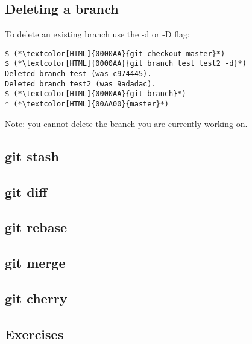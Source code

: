 \subsection{Deleting a branch}
\begin{frame}[fragile]
    \subslidetitle
To delete an existing branch use the -d or -D flag:
\begin{lstlisting}
$ (*\textcolor[HTML]{0000AA}{git checkout master}*)
$ (*\textcolor[HTML]{0000AA}{git branch test test2 -d}*)
Deleted branch test (was c974445).
Deleted branch test2 (was 9adadac).
$ (*\textcolor[HTML]{0000AA}{git branch}*)
* (*\textcolor[HTML]{00AA00}{master}*)
\end{lstlisting}

Note: you cannot delete the branch you are currently working on.

\end{frame}

\subsection{git stash}
\begin{frame}[fragile]
    \subslidetitle
\end{frame}

\subsection{git diff}
\begin{frame}[fragile]
    \subslidetitle
\end{frame}

\subsection{git rebase}
\begin{frame}[fragile]
    \subslidetitle
\end{frame}

\subsection{git merge}
\begin{frame}[fragile]
    \subslidetitle
\end{frame}

\subsection{git cherry}
\begin{frame}[fragile]
    \subslidetitle
\end{frame}

\subsection{Exercises}
\begin{frame}[fragile]
  \subslidetitle
\end{frame}
